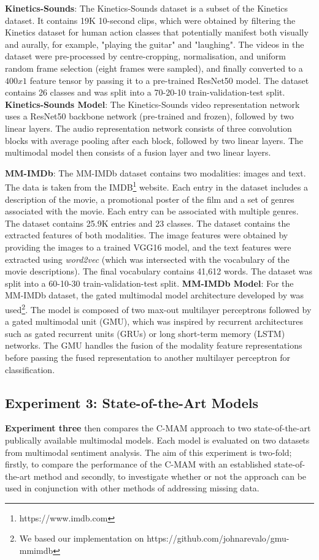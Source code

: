 \textbf{Kinetics-Sounds}: The Kinetics-Sounds dataset is a subset of the Kinetics dataset. It contains 19K 10-second clips, which were obtained by filtering the Kinetics dataset for human action classes that potentially manifest both visually and aurally, for example, "playing the guitar" and "laughing". The videos in the dataset were pre-processed by centre-cropping, normalisation, and uniform random frame selection (eight frames were sampled), and finally converted to a $400x1$ feature tensor by passing it to a pre-trained ResNet50 model. The dataset contains 26 classes and was split into a 70-20-10 train-validation-test split. \textbf{Kinetics-Sounds Model}: The Kinetics-Sounds video representation network uses a ResNet50 backbone network (pre-trained and frozen), followed by two linear layers. The audio representation network consists of three convolution blocks with average pooling after each block, followed by two linear layers. The multimodal model then consists of a fusion layer and two linear layers.

\textbf{MM-IMDb}: The MM-IMDb dataset contains two modalities: images and text. The data is taken from the IMDB\footnote{https://www.imdb.com} website. Each entry in the dataset includes a description of the movie, a promotional poster of the film and a set of genres associated with the movie. Each entry can be associated with multiple genres. The dataset contains 25.9K entries and 23 classes. The dataset contains the extracted features of both modalities. The image features were obtained by providing the images to a trained VGG16 model, and the text features were extracted using \textit{word2vec} (which was intersected with the vocabulary of the movie descriptions). The final vocabulary contains 41,612 words. The dataset was split into a 60-10-30 train-validation-test split. \textbf{MM-IMDb Model}: For the MM-IMDb dataset, the gated multimodal model architecture developed by \citet{arevalo2017gated} was used\footnote{We based our implementation on https://github.com/johnarevalo/gmu-mmimdb}. The model is composed of two max-out multilayer perceptrons \cite{pmlr-v28-goodfellow13} followed by a gated multimodal unit (GMU), which was inspired by recurrent architectures such as gated recurrent units (GRUs) or long short-term memory (LSTM) networks. The GMU handles the fusion of the modality feature representations before passing the fused representation to another multilayer perceptron for classification.

\subsection{Experiment 3: State-of-the-Art Models}
\textbf{Experiment three} then compares the C-MAM approach to two state-of-the-art publically available multimodal models. Each model is evaluated on two datasets from multimodal sentiment analysis. The aim of this experiment is two-fold; firstly, to compare the performance of the C-MAM with an established state-of-the-art method and secondly, to investigate whether or not the approach can be used in conjunction with other methods of addressing missing data. 



